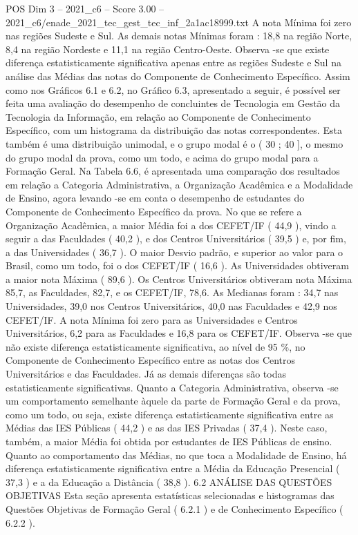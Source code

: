 \begin{textsample}{POS Dim 3 – 2021\_c6 – Score 3.00 – 2021\_c6/enade\_2021\_tec\_gest\_tec\_inf\_2a1ac18999.txt}
A nota Mínima foi zero nas regiões Sudeste e Sul.
As demais notas Mínimas foram : 18,8 na região Norte, 8,4 na região Nordeste e 11,1 na região Centro-Oeste.
Observa -se que existe diferença estatisticamente significativa apenas entre as regiões Sudeste e Sul na análise das Médias das notas do Componente de Conhecimento Específico.
Assim como nos Gráficos 6.1 e 6.2, no Gráfico 6.3, apresentado a seguir, é possível ser feita uma avaliação do desempenho de concluintes de Tecnologia em Gestão da Tecnologia da Informação, em relação ao Componente de Conhecimento Específico, com um histograma da distribuição das notas correspondentes.
Esta também é uma distribuição unimodal, e o grupo modal é o ( 30 ; 40 ], o mesmo do grupo modal da prova, como um todo, e acima do grupo modal para a Formação Geral.
Na Tabela 6.6, é apresentada uma comparação dos resultados em relação a Categoria Administrativa, a Organização Acadêmica e a Modalidade de Ensino, agora levando -se em conta o desempenho de estudantes do Componente de Conhecimento Específico da prova.
No que se refere a Organização Acadêmica, a maior Média foi a dos CEFET/IF ( 44,9 ), vindo a seguir a das Faculdades ( 40,2 ), e dos Centros Universitários ( 39,5 ) e, por fim, a das Universidades ( 36,7 ).
O maior Desvio padrão, e superior ao valor para o Brasil, como um todo, foi o dos CEFET/IF ( 16,6 ).
As Universidades obtiveram a maior nota Máxima ( 89,6 ).
Os Centros Universitários obtiveram nota Máxima 85,7, as Faculdades, 82,7, e os CEFET/IF, 78,6.
As Medianas foram : 34,7 nas Universidades, 39,0 nos Centros Universitários, 40,0 nas Faculdades e 42,9 nos CEFET/IF.
A nota Mínima foi zero para as Universidades e Centros Universitários, 6,2 para as Faculdades e 16,8 para os CEFET/IF.
Observa -se que não existe diferença estatisticamente significativa, ao nível de 95 \%, no Componente de Conhecimento Específico entre as notas dos Centros Universitários e das Faculdades.
Já as demais diferenças são todas estatisticamente significativas.
Quanto a Categoria Administrativa, observa -se um comportamento semelhante àquele da parte de Formação Geral e da prova, como um todo, ou seja, existe diferença estatisticamente significativa entre as Médias das IES Públicas ( 44,2 ) e as das IES Privadas ( 37,4 ).
Neste caso, também, a maior Média foi obtida por estudantes de IES Públicas de ensino.
Quanto ao comportamento das Médias, no que toca a Modalidade de Ensino, há diferença estatisticamente significativa entre a Média da Educação Presencial ( 37,3 ) e a da Educação a Distância ( 38,8 ). 6.2 ANÁLISE DAS QUESTÕES OBJETIVAS Esta seção apresenta estatísticas selecionadas e histogramas das Questões Objetivas de Formação Geral ( 6.2.1 ) e de Conhecimento Específico ( 6.2.2 ).

\end{textsample}
